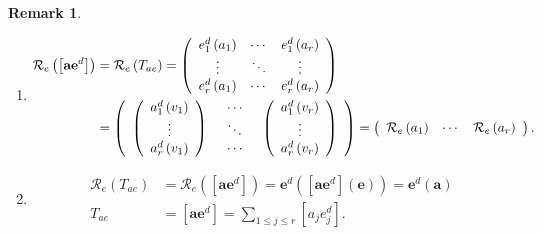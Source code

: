 \documentclass[aps,preprint]{revtex4}%
\newtheorem{remark}[theorem]{Remark}
\begin{document}
\begin{remark}
\begin{enumerate}
\item
\begin{align}
\mathcal{R}_{e}\left(  \left[  \mathbf{ae}^{d}\right]  \right)   &
=\mathcal{R}_{e}\left(  T_{ae}\right)  =\left(
\begin{array}
[c]{ccc}%
e_{1}^{d}\left(  a_{1}\right)  & \cdots & e_{1}^{d}\left(  a_{r}\right) \\
\vdots & \ddots & \vdots\\
e_{r}^{d}\left(  a_{1}\right)  & \cdots & e_{r}^{d}\left(  a_{r}\right)
\end{array}
\right) \\
&  =\left(
\begin{array}
[c]{ccc}%
\left(
\begin{array}
[c]{c}%
a_{1}^{d}\left(  v_{1}\right) \\
\vdots\\
a_{r}^{d}\left(  v_{1}\right)
\end{array}
\right)  &
\begin{array}
[c]{c}%
\cdots\\
\ddots\\
\cdots
\end{array}
& \left(
\begin{array}
[c]{c}%
a_{1}^{d}\left(  v_{r}\right) \\
\vdots\\
a_{r}^{d}\left(  v_{r}\right)
\end{array}
\right)
\end{array}
\right)  =\left(
\begin{array}
[c]{ccc}%
\mathcal{R}_{e}\left(  a_{1}\right)  & \cdots & \mathcal{R}_{e}\left(
a_{r}\right)
\end{array}
\right)  .
\end{align}


\item
\begin{align}
\mathcal{R}_{e}\left(  T_{ae}\right)   &  =\mathcal{R}_{e}\left(  \left[
\mathbf{ae}^{d}\right]  \right)  =\mathbf{e}^{d}\left(  \left[  \mathbf{ae}%
^{d}\right]  \left(  \mathbf{e}\right)  \right)  =\mathbf{e}^{d}\left(
\mathbf{a}\right) \\
T_{ae}  &  =\left[  \mathbf{ae}^{d}\right]  =\sum_{1\leq j\leq r}\left[
a_{j}e_{j}^{d}\right]  .
\end{align}

\end{enumerate}
\end{remark}
\end{document}
